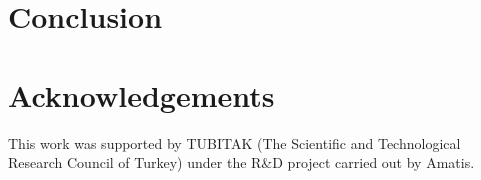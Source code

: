 \section{Conclusion}

\section*{Acknowledgements}
This work was supported by TUBITAK (The Scientific and Technological Research Council of Turkey) under the R\&D project carried out by Amatis.
